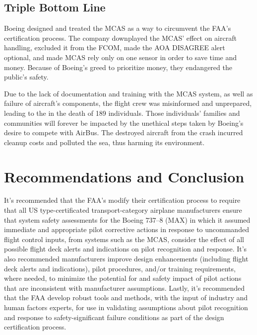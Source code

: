 \documentclass[
  10pt,
  promotesection,
  endnotes,
  draft,
]{memreport}
\begin{document}
  \subsection{Triple Bottom Line}
  Boeing designed and treated the MCAS as a way to circumvent the FAA's certification process. The company downplayed the MCAS' effect on aircraft handling, excluded it from the FCOM, made the AOA DISAGREE alert optional, and made MCAS rely only on one sensor in order to save time and money. Because of Boeing's greed to prioritize money, they endangered the public's safety.

  Due to the lack of documentation and training with the MCAS system, as well as failure of aircraft's components, the flight crew was misinformed and unprepared, leading to the in the death of 189 individuals. Those individuals' families and communities will forever be impacted by the unethical steps taken by Boeing's desire to compete with AirBus. The destroyed aircraft from the crash incurred cleanup costs and polluted the sea, thus harming its environment.

  \section{Recommendations and Conclusion}
  It's recommended that the FAA's modify their certification process to require that all US type-certificated transport-category airplane manufacturers ensure that system safety assessments for the Boeing 737--8 (MAX) in which it assumed immediate and appropriate pilot corrective actions in response to uncommanded flight control inputs, from systems such as the MCAS, consider the effect of all possible flight deck alerts and indications on pilot recognition and response. It's also recommended manufacturers improve design enhancements (including flight deck alerts and indications), pilot procedures, and/or training requirements, where needed, to minimize the potential for and safety impact of pilot actions that are inconsistent with manufacturer assumptions. Lastly, it's recommended that the FAA develop robust tools and methods, with the input of industry and human factors experts, for use in validating assumptions about pilot recognition and response to safety-significant failure conditions as part of the design certification process\autocite[12]{noauthor_safety_2019}.

  \backmatter{}
\end{document}
